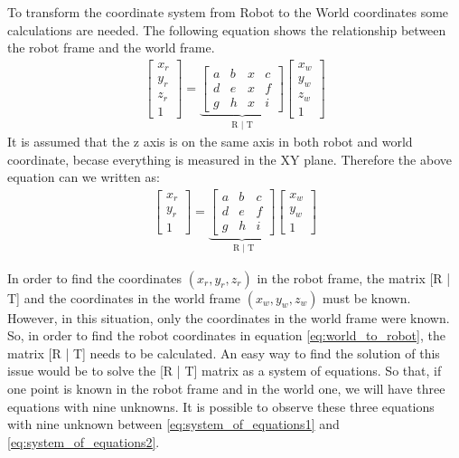 To transform the coordinate system from Robot to the World coordinates some calculations are needed. The following equation shows the relationship between the robot frame and the world frame.
\begin{align*}
\begin{bmatrix}
x_r \\
y_r \\
z_r \\
1 
\end{bmatrix}
= \underbrace{\begin{bmatrix}
a & b & x & c \\
d & e & x & f \\
g & h & x & i 
\end{bmatrix}}_{\text{R | T}}
\begin{bmatrix}
x_w \\
y_w \\
z_w\\
1 
\end{bmatrix}
\end{align*}
It is assumed that the z axis is on the same axis in both robot and world coordinate, becase everything is measured in the XY plane. Therefore the above equation can we written as: 
\begin{align}
\begin{bmatrix}
x_r \\
y_r \\
1 
\end{bmatrix}
= \underbrace{\begin{bmatrix}
a & b & c \\
d & e & f \\
g & h & i 
\end{bmatrix}}_{\text{    R   | T}}
\begin{bmatrix}
x_w \\
y_w \\
1 
\end{bmatrix}
\label{eq:world_to_robot}
\end{align}

In order to find the coordinates $(x_r,y_r,z_r)$ in the robot frame, the matrix [R | T] and the coordinates in the world frame $(x_w,y_w,z_w)$ must be known. However, in this situation, only  the coordinates in the world frame were known. So, in order to find the robot coordinates in equation \ref{eq:world_to_robot}, the matrix [R | T] needs to be calculated. An easy way to find the solution of this issue would be to solve the [R | T] matrix as a system of equations. So that, if one point is known in the robot frame and in the world one, we will have three equations with nine unknowns. It is possible to observe these three equations with nine unknown between \ref{eq:system_of_equations1} and \ref{eq:system_of_equations2}.
 
